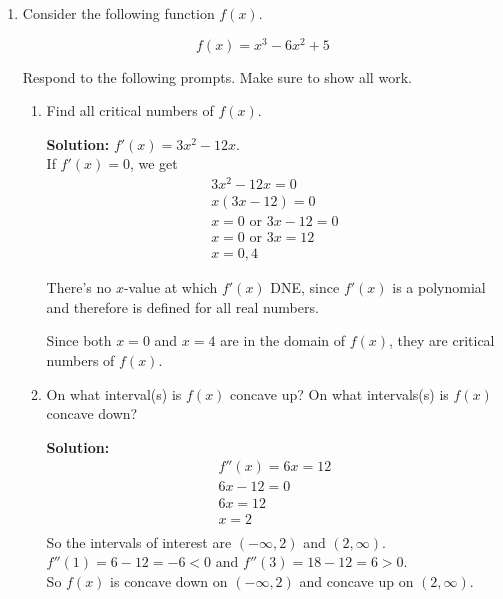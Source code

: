 \documentclass[11pt]{article}
\begin{document}
\begin{enumerate}
\newpage


\item Consider the following function $f(x)$.

\[f(x)=x^3-6x^2+5\]

Respond to the following prompts. Make sure to show all work.

\begin{enumerate}
    \item Find all critical numbers of $f(x)$.

    {\color{blue}\textbf{Solution:} $f'(x)=3x^2-12x$.\\
    If $f'(x)=0$, we get 
    \begin{align*}
        3x^2-12x=0\\
        x(3x-12)=0\\
        x=0\text{ or } 3x-12=0\\
        x=0\text{ or } 3x=12\\
        x=0, 4
    \end{align*}
    
    There's no $x$-value at which $f'(x)$ DNE, since $f'(x)$ is a polynomial and therefore is defined for all real numbers.
    
    Since both $x=0$ and $x=4$ are in the domain of $f(x)$, they are critical numbers of $f(x)$.}

    \vfill

    \item On what interval(s) is $f(x)$ concave up? On what intervals(s) is $f(x)$ concave down?

    {\color{blue}\textbf{Solution:} 
    \begin{align*}
        f''(x)=6x=12\\
        6x-12=0\\
        6x=12\\
        x=2\\
    \end{align*}
    So the intervals of interest are $(-\infty, 2)$ and $(2, \infty)$.\\    
    $f''(1)=6-12=-6<0$ and $f''(3)=18-12=6>0$.\\
    So $f(x)$ is concave down on $(-\infty, 2)$ and concave up on $(2, \infty)$.}

    \vfill
\end{enumerate}



\end{enumerate}
\end{document}
